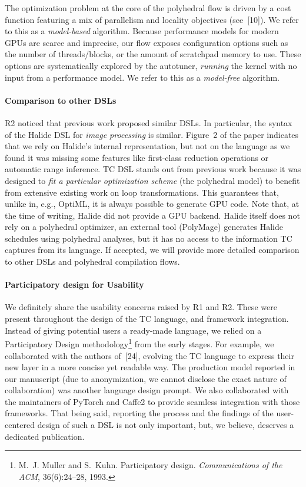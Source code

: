\documentclass{article}
\begin{document}
The optimization problem at the core of the polyhedral flow is driven by a cost
function featuring a mix of parallelism and locality objectives (see~[10]).
We refer to this as a \emph{model-based} algorithm.
Because performance models for modern GPUs are scarce and imprecise,
our flow exposes configuration options such as the number of threads/blocks, or
the amount of scratchpad memory to use.
These options are systematically explored by the autotuner, \emph{running} the
kernel with no input from a performance model.
We refer to this as a \emph{model-free} algorithm.

\paragraph{Comparison to other DSLs}
R2 noticed that previous work proposed similar DSLs.
In particular, the syntax of the Halide DSL for \emph{image processing} is similar.
Figure~2 of the paper indicates that we rely on Halide's internal
representation, but not on the language as we found it was missing some
features like first-class reduction operations or automatic range inference.
TC DSL stands out from previous work because it was designed to \emph{fit a
particular optimization scheme} (the polyhedral model) to benefit from
extensive existing work on loop transformations.
This guarantees that, unlike in, e.g., OptiML, it is always possible to
generate GPU code.
Note that, at the time of writing, Halide did not provide a GPU backend.
Halide itself does not rely on a polyhedral optimizer, an external tool
(PolyMage) generates Halide schedules using polyhedral analyses, but it has no
access to the information TC captures from its language.
If accepted, we will provide more detailed comparison to other DSLs and
polyhedral compilation flows.

\paragraph{Participatory design for Usability}
We definitely share the usability concerns raised by R1 and R2.
These were present throughout the design of the TC language, and framework integration.
Instead of giving potential users a ready-made language, we relied on a
Participatory Design methodology\footnote{M.~J. Muller and S.~Kuhn.
  Participatory design. {\em Communications of the ACM}, 36(6):24--28, 1993.}
from the early stages.
For example, we collaborated with the authors of~[24], evolving the TC
language to express their new layer in a more concise yet readable way.
The production model reported in our manuscript (due to anonymization, we
cannot disclose the exact nature of collaboration) was another language design
prompt.
We also collaborated with the maintainers of PyTorch and Caffe2 to provide
seamless integration with those frameworks.
That being said, reporting the process and the findings of the user-centered
design of such a DSL is not only important, but, we believe, deserves a
dedicated publication.
\end{document}
